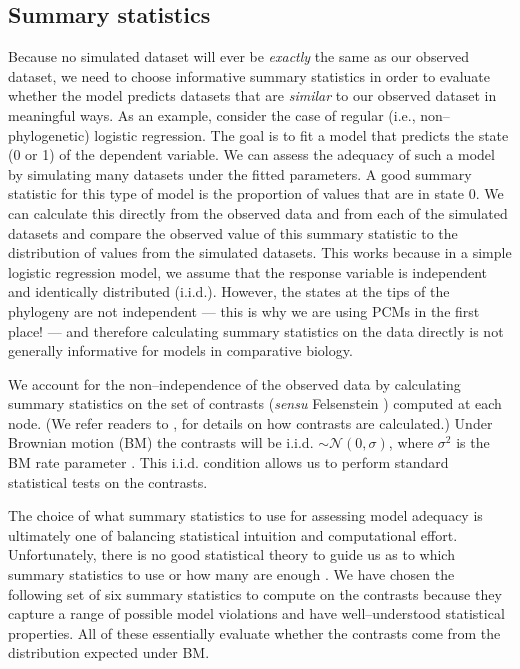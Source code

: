 \documentclass[a4paper,12pt]{article}
\begin{document}
\subsection{Summary statistics}
Because no simulated dataset will ever be \emph{exactly} the same as our observed dataset, we need to choose informative summary statistics in order to evaluate whether the model predicts datasets that are \emph{similar} to our observed dataset in meaningful ways. As an example, consider the case of regular (i.e., non--phylogenetic) logistic regression. The goal is to fit a model that predicts the state (0 or 1) of the dependent variable. We can assess the adequacy of such a model by simulating many datasets under the fitted parameters. A good summary statistic for this type of model is the proportion of values that are in state 0. We can calculate this directly from the observed data and from each of the simulated datasets and compare the observed value of this summary statistic to the distribution of values from the simulated datasets. This works because in a simple logistic regression model, we assume that the response variable is independent and identically distributed (i.i.d.). However, the states at the tips of the phylogeny are not independent --- this is why we are using PCMs in the first place! --- and therefore calculating summary statistics on the data directly is not generally informative for models in comparative biology. 

We account for the non--independence of the observed data by calculating summary statistics on the set of contrasts (\emph{sensu} Felsenstein \citep{Felsenstein1985}) computed at each node. (We refer readers to \citep{Felsenstein1985, Rohlf2001, Blomberg2012}, for details on how contrasts are calculated.) Under Brownian motion (BM) the contrasts will be i.i.d. $\sim \mathcal{N}(0, \sigma)$, where $\sigma^2$ is the BM rate parameter \citep{Felsenstein1985}. This i.i.d. condition allows us to perform standard statistical tests on the contrasts. 

The choice of what summary statistics to use for assessing model adequacy is ultimately one of balancing statistical intuition and computational effort. Unfortunately, there is no good statistical theory to guide us as to which summary statistics to use or how many are enough \citep{Gelmanbook}. We have chosen the following set of six summary statistics to compute on the contrasts because they capture a range of possible model violations and have well--understood statistical properties. All of these essentially evaluate whether the contrasts come from the distribution expected under BM. 
\end{document}
